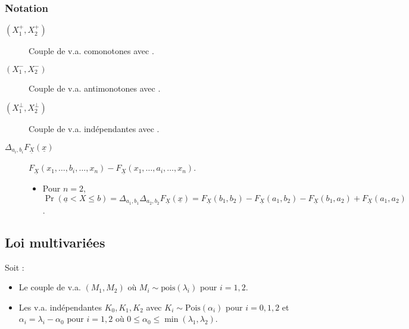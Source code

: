 \documentclass[10pt, french]{article}
\begin{document}
\begin{multicols*}{2}
\subsubsection{Notation}
\begin{distributions}[Notation]
\begin{description}
	\item[$(X_{1}^{+}, X_{2}^{+})$]	Couple de v.a. comonotones avec .
	\item[$(X_{1}^{-}, X_{2}^{-})$]	Couple de v.a. antimonotones avec .
	\item[$(X_{1}^{\perp}, X_{2}^{\perp})$]	Couple de v.a. indépendantes avec .
\end{description}
\end{distributions}

\begin{distributions}[Notation]
\begin{description}
	\item[$\Delta_{a_{i}, b_{i}}F_{\underline{X}}(\underline{x})$]	$F_{\underline{X}}(x_{1}, \dots, b_{i}, \dots, x_{n})	-	F_{\underline{X}}(x_{1}, \dots, a_{i}, \dots, x_{n})$.
		\begin{itemize}
		\item	Pour $n = 2$, $\Pr(\underline{a}	<	X	\leq		b)	=	\Delta_{a_{1}, b_{1}}\Delta_{a_{2}, b_{2}} F_{\underline{X}}(\underline{x})	=	F_{\underline{X}}(b_{1}, b_{2}) - F_{\underline{X}}(a_{1}, b_{2}) - F_{\underline{X}}(b_{1}, a_{2}) + F_{\underline{X}}(a_{1}, a_{2})$.
		\end{itemize}
\end{description}
\end{distributions}

\columnbreak
\subsection{Loi multivariées}
\begin{definitionNOHFILL}
Soit : 
\begin{itemize}
	\item	Le couple de v.a. $(M_{1}, M_{2})$ où $M_{i} \sim \text{pois}(\lambda_{i})$ pour $i	=	1, 2$.
	\item	Les v.a. indépendantes $K_{0}, K_{1}, K_{2}$ avec $K_{i}	\sim \text{Pois}(\alpha_{i})$ pour $i	=	0, 1, 2$ et $\alpha_{i}	=	\lambda_{i}	-	\alpha_{0}$ pour $i	=	1, 2$ où $0	\leq	\alpha_{0}	\leq	\min(\lambda_{1}, \lambda_{2})$.
\end{itemize}


\end{definitionNOHFILL}
\end{multicols*}
\end{document}
